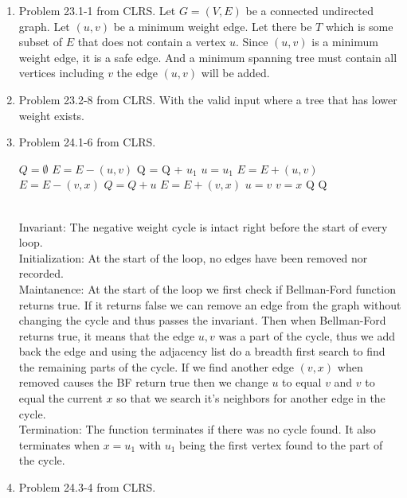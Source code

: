 \documentclass[letterpaper,11pt]{article}
\begin{document}
\begin{enumerate}
\item Problem 23.1-1 from CLRS.
Let $G = (V,E)$ be a connected undirected graph. Let $(u,v)$ be a minimum weight edge. Let there be $T$ which is some subset of $E$ that does not contain a vertex $u$. Since $(u,v)$ is a minimum weight edge, it is a safe edge. And a minimum spanning tree must contain all vertices including $v$ the edge $(u,v)$ will be added.
\item Problem 23.2-8 from CLRS.
With the valid input where a tree that has lower weight exists.
\item Problem 24.1-6 from CLRS.
\begin{algorithm}
\begin{algorithmic}[1]
\State $Q = \emptyset$
\State $E = E - (u,v)$
\State Q = Q + $u_1$
\State $u = u_1$
\State $E = E + (u,v)$
\State $E = E - (v,x)$
\State $Q = Q + u$
\State $E = E + (v,x)$
\State $u = v$
\State $v = x$
\State \Return Q
\EndIf
\EndIf
\EndFor
\EndIf
\EndFor
\State \Return Q
\EndFunction
\end{algorithmic}
\end{algorithm}
\\Invariant: The negative weight cycle is intact right before the start of every loop.
\\Initialization: At the start of the loop, no edges have been removed nor recorded.
\\Maintanence: At the start of the loop we first check if Bellman-Ford function returns true. If it returns false we can remove an edge from the graph without changing the cycle and thus passes the invariant. Then when Bellman-Ford returns true, it means that the edge $u,v$ was a part of the cycle, thus we add back the edge and using the adjacency list do a breadth first search to find the remaining parts of the cycle. If we find another edge $(v,x)$ when removed causes the BF return true then we change $u$ to equal $v$ and $v$ to equal the current $x$ so that we search it's neighbors for another edge in the cycle.
\\Termination: The function terminates if there was no cycle found. It also terminates when $x = u_1$ with $u_1$ being the first vertex found to the part of the cycle.
\item Problem 24.3-4 from CLRS.

\end{enumerate}
\end{document}
